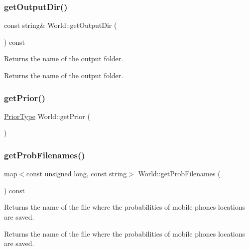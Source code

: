 \subsubsection{\texorpdfstring{get\+Output\+Dir()}{getOutputDir()}}
{\footnotesize\ttfamily const string\& World\+::get\+Output\+Dir (\begin{DoxyParamCaption}{ }\end{DoxyParamCaption}) const}

Returns the name of the output folder. \begin{DoxyReturn}{Returns}
the name of the output folder. 
\end{DoxyReturn}
\mbox{\label{class_world_aeba13dcf92dac761cf5cac1c8f2266c9}} 
\subsubsection{\texorpdfstring{get\+Prior()}{getPrior()}}
{\footnotesize\ttfamily \hyperlink{_prior_type_8h_a61286c562e68de246982fc393a7c23a5}{Prior\+Type} World\+::get\+Prior (\begin{DoxyParamCaption}{ }\end{DoxyParamCaption})}

\mbox{\label{class_world_a026bdf1e190cdaf02481c548b8ca1a6f}} 
\subsubsection{\texorpdfstring{get\+Prob\+Filenames()}{getProbFilenames()}}
{\footnotesize\ttfamily map$<$const unsigned long, const string$>$ World\+::get\+Prob\+Filenames (\begin{DoxyParamCaption}{ }\end{DoxyParamCaption}) const}

Returns the name of the file where the probabilities of mobile phones locations are saved. \begin{DoxyReturn}{Returns}
the name of the file where the probabilities of mobile phones locations are saved. 
\end{DoxyReturn}
\mbox{\label{class_world_aebe7c211a9ddae90773f6ec880cdca15}} 
